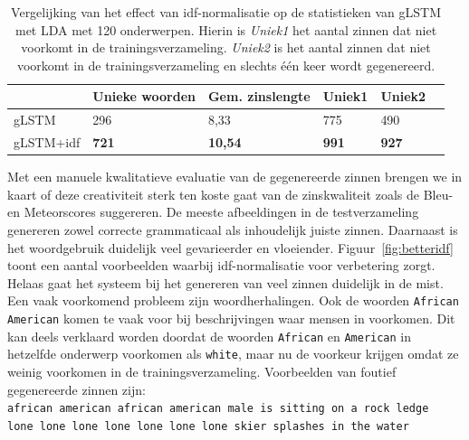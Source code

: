     \begin{table}
    	\centering
    	\begin{tabular}{llllll}
    		~                   & Unieke woorden & Gem. zinslengte & Uniek1 & Uniek2 \\ \hline
    		gLSTM         				  & 296   & 8,33   & 775   & 490  \\
    		
    		gLSTM+idf 				  & \textbf{721}   & \textbf{10,54}   & \textbf{991}   & \textbf{927}    \\\hline
    	\end{tabular}
    	\caption[Vergelijking effect idf-normalisatie op de statistieken van gLSTM met LDA met 120 onderwerpen]{Vergelijking van het effect van idf-normalisatie op de statistieken van gLSTM met LDA met 120 onderwerpen. Hierin is \emph{Uniek1} het aantal zinnen dat niet voorkomt in de trainingsverzameling. \emph{Uniek2} is het aantal zinnen dat niet voorkomt in de trainingsverzameling en slechts \'e\'en keer wordt gegenereerd.}
    	\label{table:idf-stats}
    \end{table}
    
Met een manuele kwalitatieve evaluatie van de gegenereerde zinnen brengen we in kaart of deze creativiteit sterk ten koste gaat van de zinskwaliteit zoals de Bleu- en Meteorscores suggereren. 
De meeste afbeeldingen in de testverzameling genereren zowel correcte grammaticaal als inhoudelijk juiste zinnen.
Daarnaast is het woordgebruik duidelijk veel gevarieerder en vloeiender.
Figuur~\ref{fig:betteridf} toont een aantal voorbeelden waarbij idf-normalisatie voor verbetering zorgt.
Helaas gaat het systeem bij het genereren van veel zinnen duidelijk in de mist. Een vaak voorkomend probleem zijn woordherhalingen. Ook de woorden \texttt{African American} komen te vaak voor bij beschrijvingen waar mensen in voorkomen. Dit kan deels verklaard worden doordat de woorden \texttt{African} en \texttt{American} in hetzelfde onderwerp voorkomen als \texttt{white}, maar nu de voorkeur krijgen omdat ze weinig voorkomen in de trainingsverzameling. Voorbeelden van foutief gegenereerde zinnen zijn:\\
\texttt{african american african american male is sitting on a rock ledge}\\
\texttt{lone lone lone lone lone lone lone skier splashes in the water}

